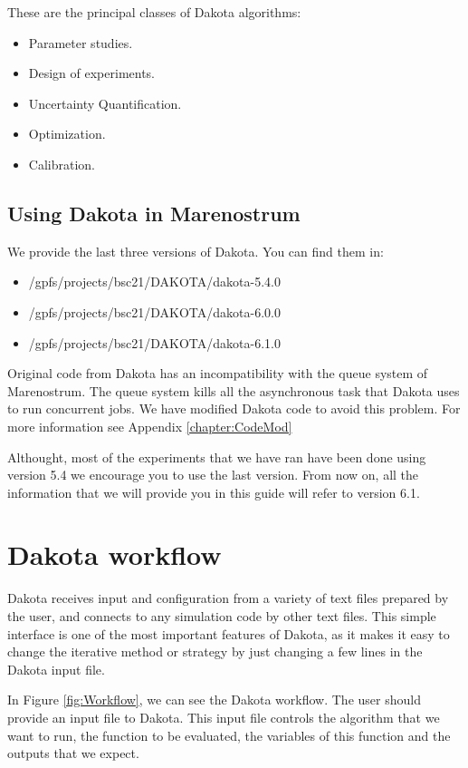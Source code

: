 \documentclass[12pt,a4paper,article]{memoir} %
\begin{document}
These are the principal classes of Dakota algorithms:
\begin{itemize}
\item Parameter studies.
\item Design of experiments.
\item Uncertainty Quantification.
\item Optimization.
\item Calibration.
\end{itemize}

\section{Using Dakota in Marenostrum}
We provide the last three versions of Dakota. You can find them in:

\begin{itemize}
\item /gpfs/projects/bsc21/DAKOTA/dakota-5.4.0
\item /gpfs/projects/bsc21/DAKOTA/dakota-6.0.0
\item /gpfs/projects/bsc21/DAKOTA/dakota-6.1.0
\end{itemize}

Original code from Dakota has an incompatibility with the queue system of Marenostrum. The queue system kills all the asynchronous task that Dakota uses to run concurrent jobs. We have modified Dakota code to avoid this problem. For more information see Appendix \ref{chapter:CodeMod}

Althought, most of the experiments that we have ran have been done using version 5.4 we encourage you to use the last version. From now on, all the information that we will provide you in this guide will refer to version 6.1.


\chapter{Dakota workflow}

Dakota receives input and configuration from a variety of text files prepared by the user, and connects to any simulation code by other text files. This simple interface is one of the most important features of Dakota, as it makes it easy to change the iterative method or strategy by just changing a few lines in the Dakota input file.

In Figure \ref{fig:Workflow}, we can see the Dakota workflow. The user should provide an input file to Dakota. This input file controls the algorithm that we want to run, the function to be evaluated, the variables of this function and the outputs that we expect.
\end{document}
